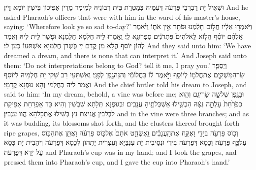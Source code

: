 {וּשְׁאֵיל יָת רַבְרְבֵי פַּרְעֹה דְּעִמֵּיהּ בְּמַטְּרַת בֵּית רִבּוֹנֵיהּ לְמֵימַר מָדֵין אַפֵּיכוֹן בִּישִׁין יוֹמָא דֵּין׃}
{And he asked Pharaoh’s officers that were with him in the ward of his master’s house, saying: ‘Wherefore look ye so sad to-day?’}{}
{וַיֹּאמְר֣וּ אֵלָ֔יו חֲל֣וֹם חָלַ֔מְנוּ וּפֹתֵ֖ר אֵ֣ין אֹת֑וֹ וַיֹּ֨אמֶר אֲלֵהֶ֜ם יוֹסֵ֗ף הֲל֤וֹא לֵֽאלֹהִים֙ פִּתְרֹנִ֔ים סַפְּרוּ\maqqaf נָ֖א לִֽי׃}
{וַאֲמַרוּ לֵיהּ חֶלְמָא חֲלַמְנָא וּפָשַׁר לֵית לֵיהּ וַאֲמַר לְהוֹן יוֹסֵף הֲלָא מִן קֳדָם יְיָ פֻּשְׁרַן חֶלְמַיָּא אִשְׁתַּעוֹ כְעַן לִי׃}
{And they said unto him: ‘We have dreamed a dream, and there is none that can interpret it.’ And Joseph said unto them: ‘Do not interpretations belong to God? tell it me, I pray you.’}{}
{וַיְסַפֵּ֧ר שַֽׂר\maqqaf הַמַּשְׁקִ֛ים אֶת\maqqaf חֲלֹמ֖וֹ לְיוֹסֵ֑ף וַיֹּ֣אמֶר ל֔וֹ בַּחֲלוֹמִ֕י וְהִנֵּה\maqqaf גֶ֖פֶן לְפָנָֽי׃}
{וְאִשְׁתַּעִי רַב שָׁקֵי יָת חֶלְמֵיהּ לְיוֹסֵף וַאֲמַר לֵיהּ בְּחֶלְמִי וְהָא גוּפְנָא קֳדָמָי׃}
{And the chief butler told his dream to Joseph, and said to him: ‘In my dream, behold, a vine was before me;}{}
{וּבַגֶּ֖פֶן שְׁלֹשָׁ֣ה שָׂרִיגִ֑ם וְהִ֤וא כְפֹרַ֙חַת֙ עָלְתָ֣ה נִצָּ֔הּ הִבְשִׁ֥ילוּ אַשְׁכְּלֹתֶ֖יהָ עֲנָבִֽים׃}
{וּבְגוּפְנָא תְּלָתָא שִׁבְשִׁין וְהִיא כַּד אַפְרַחַת אַפֵּיקַת לַבְלַבִּין אֲנֵיצַת נַץ בְּשִׁילוּ אֶתְכָּלַהָא הֲווֹ עִנְבִּין׃}
{and in the vine were three branches; and as it was budding, its blossoms shot forth, and the clusters thereof brought forth ripe grapes,}{}
{וְכ֥וֹס פַּרְעֹ֖ה בְּיָדִ֑י וָאֶקַּ֣ח אֶת\maqqaf הָֽעֲנָבִ֗ים וָֽאֶשְׂחַ֤ט אֹתָם֙ אֶל\maqqaf כּ֣וֹס פַּרְעֹ֔ה וָאֶתֵּ֥ן אֶת\maqqaf הַכּ֖וֹס עַל\maqqaf כַּ֥ף פַּרְעֹֽה׃}
{וְכָסָא דְּפַרְעֹה בִּידִי וּנְסֵיבִית יָת עִנְבַּיָּא וַעֲצַרִית יָתְהוֹן לְכָסָא דְּפַרְעֹה וִיהַבִית יָת כָּסָא עַל יְדָא דְּפַרְעֹה׃}
{and Pharaoh’s cup was in my hand; and I took the grapes, and pressed them into Pharaoh’s cup, and I gave the cup into Pharaoh’s hand.’}{}
